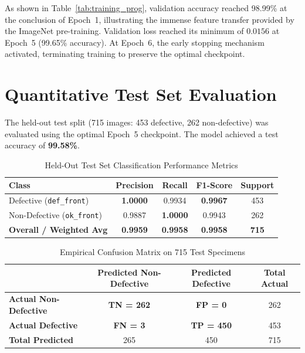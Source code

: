 \documentclass[12pt,a4paper]{report}
\begin{document}
As shown in Table~\ref{tab:training_prog}, validation accuracy reached 98.99\% at the conclusion of Epoch~1, illustrating the immense feature transfer provided by the ImageNet pre-training. Validation loss reached its minimum of $0.0156$ at Epoch~5 (99.65\% accuracy). At Epoch~6, the early stopping mechanism activated, terminating training to preserve the optimal checkpoint.

\section{Quantitative Test Set Evaluation}
The held-out test split (715 images: 453 defective, 262 non-defective) was evaluated using the optimal Epoch~5 checkpoint. The model achieved a test accuracy of \textbf{99.58\%}.

\begin{table}[h]
\centering
\caption{Held-Out Test Set Classification Performance Metrics}
\label{tab:test_metrics}
\begin{tabular}{lcccc}
\toprule
\textbf{Class} & \textbf{Precision} & \textbf{Recall} & \textbf{F1-Score} & \textbf{Support} \\
\midrule
Defective (\texttt{def\_front}) & \textbf{1.0000} & 0.9934 & \textbf{0.9967} & 453 \\
Non-Defective (\texttt{ok\_front}) & 0.9887 & \textbf{1.0000} & 0.9943 & 262 \\
\midrule
\textbf{Overall / Weighted Avg} & \textbf{0.9959} & \textbf{0.9958} & \textbf{0.9958} & \textbf{715} \\
\bottomrule
\end{tabular}
\end{table}

\begin{table}[h]
\centering
\caption{Empirical Confusion Matrix on 715 Test Specimens}
\label{tab:confusion_matrix}
\begin{tabular}{lccc}
\toprule
& \textbf{Predicted Non-Defective} & \textbf{Predicted Defective} & \textbf{Total Actual} \\
\midrule
\textbf{Actual Non-Defective} & \textbf{TN = 262} & \textbf{FP = 0} & 262 \\
\textbf{Actual Defective} & \textbf{FN = 3} & \textbf{TP = 450} & 453 \\
\midrule
\textbf{Total Predicted} & 265 & 450 & 715 \\
\bottomrule
\end{tabular}
\end{table}
\end{document}
